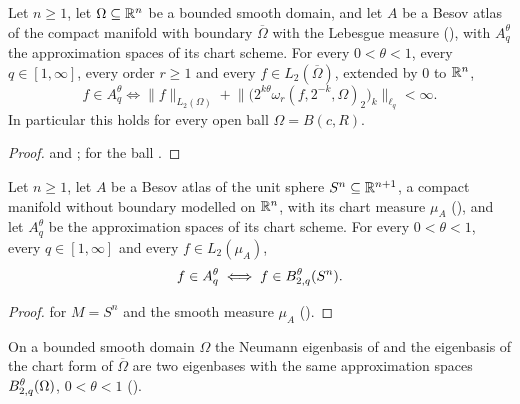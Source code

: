 \begin{example}
\label{ex:spectral-besov-smooth-domain}
\leanok
{}
Let $n \geq 1$, let $\Omega \subseteq \mathbb{R}^n$ be a bounded smooth domain, and let $A$ be a Besov atlas
of the compact manifold with boundary $\overline{\Omega}$ with the Lebesgue measure
(), with $A^\theta_q$ the approximation spaces of its chart
scheme. For every $0 < \theta < 1$, every $q \in [1, \infty]$, every order $r \geq 1$ and every
$f \in L_2(\overline{\Omega})$, extended by $0$ to $\mathbb{R}^n$,
\[
  f \in A^\theta_q \iff
  \|f\|_{L_2(\Omega)} + \bigl\| \bigl(2^{k\theta} \omega_r(f, 2^{-k}, \Omega)_2\bigr)_k
    \bigr\|_{\ell_q} < \infty .
\]
In particular this holds for every open ball $\Omega = B(c, R)$.
\end{example}

\begin{proof}
\leanok
{} and ; for the ball
.
\end{proof}

\begin{example}
\label{ex:sphere-eigenbasis}
\leanok
{}
Let $n \geq 1$, let $A$ be a Besov atlas of the unit sphere $S^n \subseteq \mathbb{R}^{n+1}$, a compact
manifold without boundary modelled on $\mathbb{R}^n$, with its chart measure $\mu_A$
(), and let $A^\theta_q$ be the approximation spaces of its chart
scheme. For every $0 < \theta < 1$, every $q \in [1, \infty]$ and every $f \in L_2(\mu_A)$,
\[
  f \in A^\theta_q \iff f \in B^{\theta}_{2,q}(S^n) .
\]
\end{example}

\begin{proof}
\leanok
{} for $M = S^n$ and the smooth measure $\mu_A$
().
\end{proof}

On a bounded smooth domain $\Omega$ the Neumann eigenbasis of  and the
eigenbasis of the chart form of $\overline{\Omega}$ are two eigenbases with the same approximation
spaces $B^{\theta}_{2,q}(\Omega)$, $0 < \theta < 1$
().
